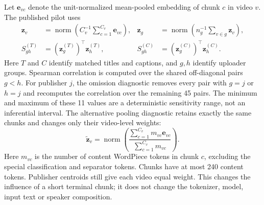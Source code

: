 Let $\mathbf e_{vc}$ denote the unit-normalized mean-pooled embedding of chunk $c$ in video $v$. The published pilot uses
\begin{align}
\mathbf z_v &= \operatorname{norm}\!\left(C_v^{-1}\sum_{c=1}^{C_v}\mathbf e_{vc}\right), &
\mathbf z_g &= \operatorname{norm}\!\left(n_g^{-1}\sum_{v\in g}\mathbf z_v\right),\\
S^{(T)}_{gh} &= (\mathbf z_g^{(T)})^\top\mathbf z_h^{(T)}, &
S^{(C)}_{gh} &= (\mathbf z_g^{(C)})^\top\mathbf z_h^{(C)}.
\end{align}
Here $T$ and $C$ identify matched titles and captions, and $g,h$ identify uploader groups. Spearman correlation is computed over the shared off-diagonal pairs $g<h$. For publisher $j$, the omission diagnostic removes every pair with $g=j$ or $h=j$ and recomputes the correlation over the remaining 45 pairs. The minimum and maximum of these 11 values are a deterministic sensitivity range, not an inferential interval.
The alternative pooling diagnostic retains exactly the same chunks and changes only their video-level weights:
\begin{equation}
\widetilde{\mathbf z}_v=\operatorname{norm}\!\left(\frac{\sum_{c=1}^{C_v}m_{vc}\mathbf e_{vc}}{\sum_{c=1}^{C_v}m_{vc}}\right).
\end{equation}
Here $m_{vc}$ is the number of content WordPiece tokens in chunk $c$, excluding the special classification and separator tokens. Chunks have at most 240 content tokens. Publisher centroids still give each video equal weight. This changes the influence of a short terminal chunk; it does not change the tokenizer, model, input text or speaker composition.

